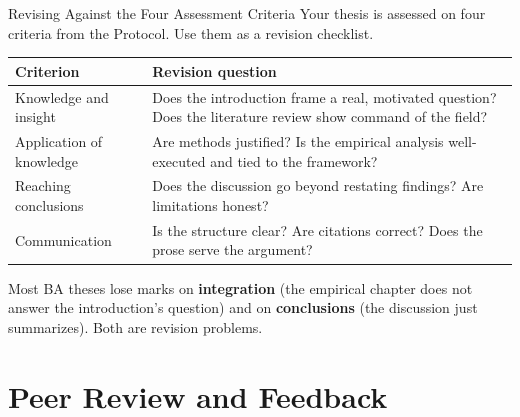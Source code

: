 \documentclass[aspectratio=169,11pt]{beamer}
\begin{document}
\begin{frame}{Revising Against the Four Assessment Criteria}
    \footnotesize
    Your thesis is assessed on four criteria from the Protocol. Use them as a revision checklist.
    \vspace{0.1cm}
    \begin{table}
        \scriptsize
        \begin{tabular}{p{}p{}}
            \toprule
            \textbf{Criterion} & \textbf{Revision question} \\
            \midrule
            Knowledge and insight & Does the introduction frame a real, motivated question? Does the literature review show command of the field? \\
            \addlinespace
            Application of knowledge & Are methods justified? Is the empirical analysis well-executed and tied to the framework? \\
            \addlinespace
            Reaching conclusions & Does the discussion go beyond restating findings? Are limitations honest? \\
            \addlinespace
            Communication & Is the structure clear? Are citations correct? Does the prose serve the argument? \\
            \bottomrule
        \end{tabular}
    \end{table}
    \vspace{0.2cm}
    Most BA theses lose marks on \textbf{integration} (the empirical chapter does not answer the introduction's question) and on \textbf{conclusions} (the discussion just summarizes). Both are revision problems.
\end{frame}

\section{Peer Review and Feedback}
\end{document}
